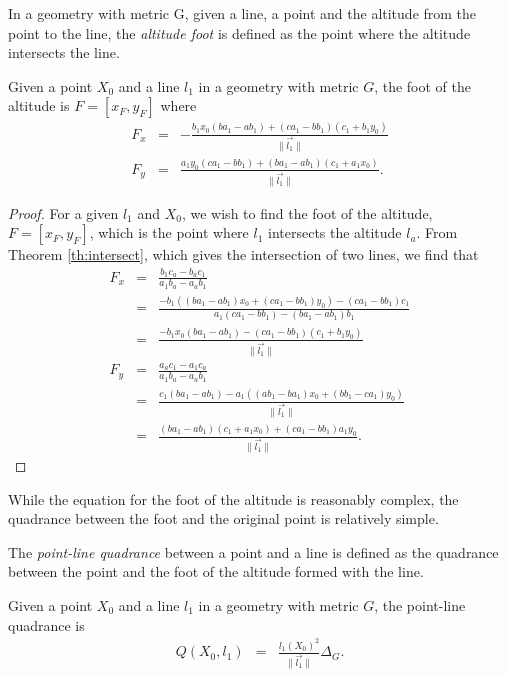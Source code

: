 \begin{definition}In a geometry with metric G, given a line, a point and the altitude from the point to the line, the \emph{altitude foot} is defined as the point where the altitude intersects the line.
\end{definition}
\begin{theorem}\label{theorem:foot}Given a point $X_0$ and a line $l_1$ in a geometry with metric $G$, the foot of the altitude is $F = [x_F, y_F]$ where
\begin{eqnarray}
F_x & = & -\frac{b_1x_0(ba_1 - ab_1) + (ca_1 - bb_1)(c_1 + b_1y_0)}{\|\vec{l_1}\|}\\
F_y & = &  \frac{a_1y_0(ca_1 - bb_1) + (ba_1 - ab_1)(c_1 + a_1x_0)}{\|\vec{l_1}\|}.
\end{eqnarray}
\end{theorem}
\begin{proof}
For a given $l_1$ and $X_0$, we wish to find the foot of the altitude, $F = [x_F, y_F]$, which is the point where $l_1$ intersects the altitude $l_a$. From Theorem \ref{th:intersect}, which gives the intersection of two lines, we find that
\begin{eqnarray}
F_x & = & \frac{b_1c_a - b_ac_1}{a_1b_a - a_ab_1}\nonumber\\
    & = & \frac{-b_1((ba_1 - ab_1)x_0 + (ca_1 - bb_1)y_0) - (ca_1 - bb_1)c_1}{a_1(ca_1 - bb_1) - (ba_1 - ab_1)b_1}\nonumber\\
    & = & \frac{-b_1x_0(ba_1 - ab_1) - (ca_1 - bb_1)(c_1 + b_1y_0) }{\|\vec{l_1}\|}\nonumber\\
F_y & = & \frac{a_ac_1 - a_1c_a}{a_1b_a - a_ab_1}\nonumber\\
    & = & \frac{c_1(ba_1 - ab_1) - a_1((ab_1 - ba_1)x_0 + (bb_1 - ca_1)y_0)}{\|\vec{l_1}\|}\nonumber\\
    & = & \frac{(ba_1 - ab_1)(c_1 + a_1x_0) + (ca_1 - bb_1)a_1y_0}{\|\vec{l_1}\|}.\nonumber
\end{eqnarray}
\end{proof}
While the equation for the foot of the altitude is reasonably complex, the quadrance between the foot and the original point is relatively simple.
\begin{definition}The \emph{point-line quadrance} between a point and a line is defined as the quadrance between the point and the foot of the altitude formed with the line.
\end{definition}
\begin{theorem}Given a point $X_0$ and a line $l_1$ in a geometry with metric $G$, the point-line quadrance is
\begin{eqnarray}
Q(X_0, l_1) & = & \frac{l_1(X_0)^2}{\|\vec{l_1}\|}\Delta_G.\label{eq:point-line}
\end{eqnarray}
\end{theorem}
